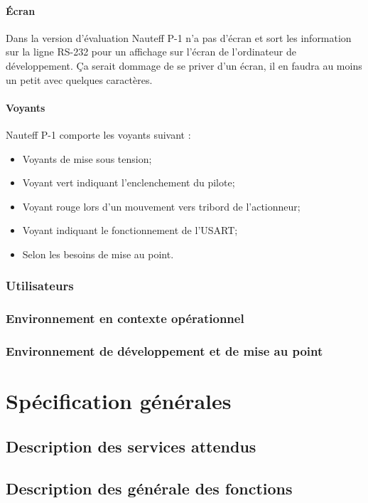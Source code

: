 \documentclass[a4paper,11pt]{report}
\begin{document}
\subsubsection{Écran}
Dans la version d'évaluation Nauteff P-1 n'a pas d'écran et  sort les information
sur la ligne RS-232 pour un affichage sur l'écran de l'ordinateur de développement.
Ça serait dommage de se priver d'un écran, il en faudra au moins un petit avec quelques caractères.

\subsubsection{Voyants}
Nauteff P-1 comporte les voyants suivant :
\begin{itemize}
	\item Voyants de mise sous tension;
	\item Voyant vert indiquant l'enclenchement du pilote;
	\item Voyant rouge lors d'un mouvement vers tribord de l'actionneur;
	\item Voyant indiquant le fonctionnement de l'USART;
	\item Selon les besoins de mise au point.
\end{itemize}

\subsection{Utilisateurs}

\subsection{Environnement en contexte opérationnel}

\subsection{Environnement de développement et de mise au point}

\chapter{Spécification générales}
\section{Description des services attendus}

\section{Description des générale des fonctions}
\end{document}

